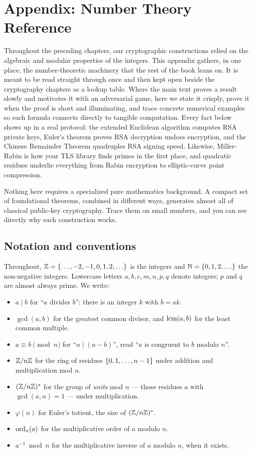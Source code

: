 \chapter{Appendix: Number Theory Reference}

Throughout the preceding chapters, our cryptographic constructions relied on the algebraic and modular properties of the integers. This appendix gathers, in one place, the number-theoretic machinery that the rest of the book leans on. It is meant to be read straight through once and then kept open beside the cryptography chapters as a lookup table. Where the main text proves a result slowly and motivates it with an adversarial game, here we state it crisply, prove it when the proof is short and illuminating, and trace concrete numerical examples so each formula connects directly to tangible computation. Every fact below shows up in a real protocol: the extended Euclidean algorithm computes RSA private keys, Euler's theorem proves RSA decryption undoes encryption, and the Chinese Remainder Theorem quadruples RSA signing speed. Likewise, Miller-Rabin is how your TLS library finds primes in the first place, and quadratic residues underlie everything from Rabin encryption to elliptic-curve point compression.

Nothing here requires a specialized pure mathematics background. A compact set of foundational theorems, combined in different ways, generates almost all of classical public-key cryptography. Trace them on small numbers, and you can see directly why each construction works.

\chapterline

\section{Notation and conventions}
\label{ch40:notation}

Throughout, $\Z = \set{\dots,-2,-1,0,1,2,\dots}$ is the integers and $\N = \set{0,1,2,\dots}$ the
non-negative integers. Lowercase letters $a,b,c,m,n,p,q$ denote integers; $p$ and $q$ are almost
always prime. We write:

\begin{itemize}
\item $a \mid b$ for ``$a$ divides $b$'': there is an integer $k$ with $b = ak$.
\item $\gcd(a,b)$ for the greatest common divisor, and $\operatorname{lcm}(a,b)$ for the least common multiple.
\item $a \equiv b \pmod{n}$ for ``$n \mid (a-b)$'', read ``$a$ is congruent to $b$ modulo $n$''.
\item $\mathbb{Z}/n\mathbb{Z}$ for the ring of residues $\{0,1,\dots,n-1\}$ under addition and multiplication
      mod $n$.
\item $(\mathbb{Z}/n\mathbb{Z})^{*}$ for the group of \emph{units} mod $n$ --- those residues $a$ with $\gcd(a,n)=1$ ---
      under multiplication.
\item $\varphi(n)$ for Euler's totient, the size of $(\mathbb{Z}/n\mathbb{Z})^{*}$.
\item $\operatorname{ord}_n(a)$ for the multiplicative order of $a$ modulo $n$.
\item $a^{-1} \bmod n$ for the multiplicative inverse of $a$ modulo $n$, when it exists.
\end{itemize}


